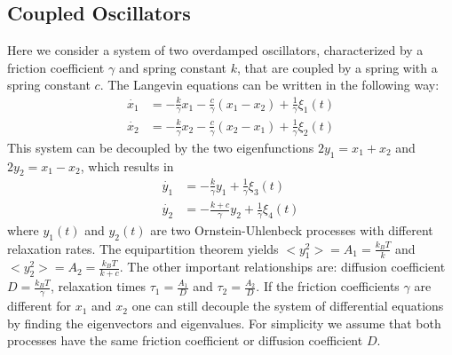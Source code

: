 \documentclass[%
 reprint,
 amsmath,amssymb,
 aps,
]{revtex4-1}
\begin{document}
\subsection{Coupled Oscillators}
Here we consider a system of two overdamped oscillators, characterized by a friction coefficient $\gamma$ and spring constant $k$, that are coupled by a spring with a spring constant $c$.  The Langevin equations can be written in the following way:
\begin{equation}
	\begin{aligned}
		\dot{x_1} &= -\frac{k}{\gamma}x_{1}-\frac{c}{\gamma}(x_{1}-x_{2}) +\frac{1}{\gamma}\xi_{1}(t)\\
		\dot{x_2} &= -\frac{k}{\gamma}x_{2}-\frac{c}{\gamma}(x_{2}-x_{1}) +\frac{1}{\gamma}\xi_{2}(t)
	\end{aligned}
\end{equation}
This system can be decoupled by the two eigenfunctions $2y_{1}=x_{1}+x_{2}$ and $2y_{2}=x_{1}-x_{2}$, which results in
\begin{equation}
	\begin{aligned}
		\dot{y_1} &= -\frac{k}{\gamma}y_{1} +\frac{1}{\gamma}\xi_{3}(t)\\
		\dot{y_2} &= -\frac{k+c}{\gamma}y_{2} +\frac{1}{\gamma}\xi_{4}(t)
	\end{aligned}
\end{equation}
where $y_{1}(t)$ and $y_{2}(t)$ are two Ornstein-Uhlenbeck processes with different relaxation rates.  The equipartition theorem yields $<y_{1}^{2}> = A_{1} = \frac{k_{B}T}{k}$ and $<y_{2}^{2}> = A_{2} = \frac{k_{B}T}{k+c}$.  The other important relationships are: diffusion coefficient $D=\frac{k_{B}T}{\gamma}$, relaxation times $\tau_{1}=\frac{A_{1}}{D}$ and $\tau_{2}=\frac{A_{2}}{D}$. If the friction coefficients $\gamma$ are different for $x_{1}$ and $x_{2}$ one can still decouple the system of differential equations by finding the eigenvectors and eigenvalues.  For simplicity we assume that both processes have the same friction coefficient or diffusion coefficient $D$.
\end{document}
